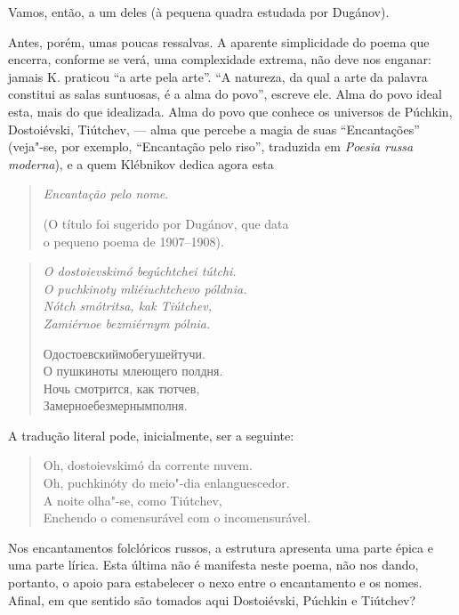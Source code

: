 {Vamos, então, a um deles (à pequena quadra estudada por Dugánov).

Antes, porém, umas poucas ressalvas. A aparente simplicidade do poema
que encerra, conforme se verá, uma complexidade extrema, não deve nos
enganar: jamais K. praticou ``a arte pela arte''. ``A natureza, da qual
a arte da palavra constitui as salas suntuosas, é a alma do povo'',
escreve ele. Alma do povo ideal esta, mais do que idealizada. Alma do
povo que conhece os universos de Púchkin, Dostoiévski, Tiútchev, --- alma
que percebe a magia de suas ``Encantações'' (veja"-se, por exemplo, ``Encantação pelo riso'', traduzida em \emph{Poesia russa moderna}), e
a quem Klébnikov dedica agora esta

\begin{verse}
\emph{Encantação pelo nome}. 

(O título foi sugerido por Dugánov, que data \\
o pequeno poema de 1907--1908). 
\end{verse}

\begin{verse}
\emph{O dostoievskimó begúchtchei tútchi.} \\
\emph{O puchkinoty mliéiuchtchevo póldnia.} \\
\emph{Nótch smótritsa, kak Tiútchev,} \\
\emph{Zamiérnoe bezmiérnym pólnia.} 

Одостоевскиймобегушейтучи. \\
О пушкиноты млеющего полдня. \\
Ночь смотрится, как тютчев, \\
Замерноебезмернымполня.
\end{verse}

A tradução literal pode, inicialmente, ser a seguinte:

\begin{verse}
Oh, dostoievskimó da corrente nuvem. \\
Oh, puchkinóty do meio"-dia \qb{}enlanguescedor. \\
A noite olha"-se, como Tiútchev, \\
Enchendo o comensurável com \qb{}o incomensurável.
\end{verse}

Nos encantamentos folclóricos russos, a estrutura apresenta uma parte
épica e uma parte lírica. Esta última não é manifesta neste poema, não
nos dando, portanto, o apoio para estabelecer o nexo entre o encantamento
e os nomes. Afinal, em que sentido são tomados aqui Dostoiévski, Púchkin
e Tiútchev?

}
